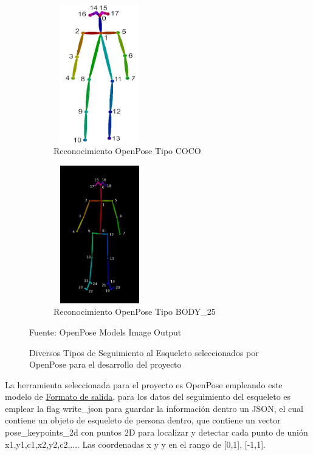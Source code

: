 \begin{figure}[ht]
	\centering
	\begin{subfigure}{.5\textwidth}
		\centering
		\includegraphics[width=4cm,height=6cm]{./Images/openposet1.png}
		\caption{Reconocimiento OpenPose Tipo COCO}
		\label{open1}
	\end{subfigure}%
	\begin{subfigure}{.5\textwidth}
		\centering
		\includegraphics[width=4cm,height=6cm]{./Images/openposet2.png}
		\caption{Reconocimiento OpenPose Tipo BODY\_25}
		\label{open2}
	\end{subfigure}
	\caption{Diversos Tipos de Seguimiento al Esqueleto seleccionados por OpenPose para el desarrollo del proyecto}
	\label{exampleesqueletotrack}
	\footnotesize Fuente: OpenPose Models Image Output \cite{cao2017realtime} \cite{8765346}
\end{figure}

La herramienta seleccionada para el proyecto es OpenPose empleando este modelo de \href{https://github.com/CMU-Perceptual-Computing-Lab/openpose/blob/master/doc/output.md}{Formato de salida}, para los datos del seguimiento del esqueleto es emplear la flag write\_json para guardar la información dentro un JSON, el cual contiene un objeto de esqueleto de persona dentro, que contiene un vector pose\_keypoints\_2d con puntos 2D para localizar y detectar cada punto de unión x1,y1,c1,x2,y2,c2,.... Las coordenadas x y y en el rango de [0,1], [-1,1].

